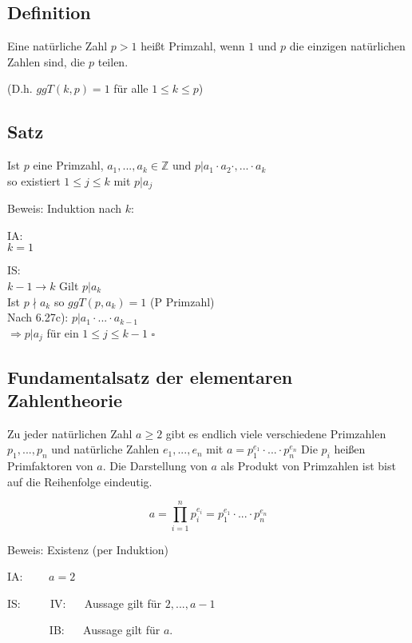 \documentclass[a4paper, 12pt, twoside] {article}
\begin{document}
\subsection[Definition (Primzahl)]{Definition} %
Eine natürliche Zahl $p > 1$ heißt Primzahl, wenn $1$ und $p$ die einzigen natürlichen Zahlen sind,
die $p$ teilen.

(D.h. $ggT(k, p) = 1$ für alle $1 \leq k \leq p$)

\subsection{Satz} %
Ist $p$ eine Primzahl, $a_1, ... ,a_k \in \mathbb{Z}$ und $p | a_1 \cdot a_2 \cdot, ... \cdot a_k$ \\
so existiert $1 \leq j \leq k$ mit $p | a_j$

Beweis: Induktion nach $k$:

IA: \\
$k = 1$ \checkmark

IS: \\
$k -1 \rightarrow k$ Gilt $p | a_k$ \checkmark \\
Ist $p \nmid a_k$ so $ggT(p, a_k) = 1$ (P Primzahl) \\
Nach 6.27c): $p | a_1 \cdot ... \cdot a_{k-1}$ \\
$\Rightarrow p | a_j$ für ein $1 \leq j \leq k - 1$ \hfill $\square$

\subsection{Fundamentalsatz der elementaren Zahlentheorie} %
Zu jeder natürlichen Zahl $a \geq 2$ gibt es endlich viele
verschiedene Primzahlen $p_1, ... ,p_n$ und natürliche Zahlen $e_1, ... ,e_n$ mit
$a = p_{1}^{e_1} \cdot ... \cdot p_{n}^{e_n}$
Die $p_i$ heißen Primfaktoren von $a$. Die Darstellung von $a$ als Produkt von Primzahlen
ist bist auf die Reihenfolge eindeutig.


$$a = \prod_{i=1}^{n} p^{e_i}_i = p_1^{e_1} \cdot ... \cdot p_n^{e_n}$$

Beweis: Existenz (per Induktion)

IA: $\qquad a = 2$ \checkmark

IS: $\qquad$ IV: $\quad$ Aussage gilt für $2, ..., a-1$

$\qquad\quad\ \ $ IB: $\quad$ Aussage gilt für $a$.
\end{document}

